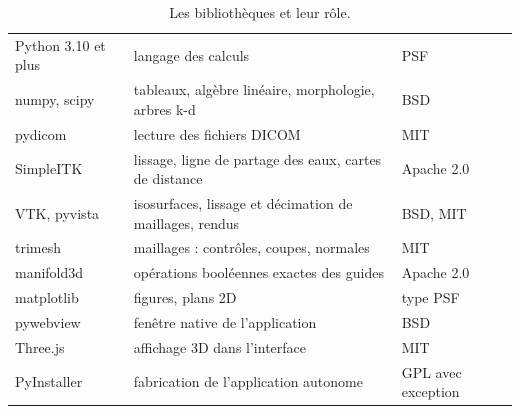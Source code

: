 \begin{table}[htbp]
\centering\small
\caption{Les bibliothèques et leur rôle.}
\label{tab:bibliotheques}
\begin{tabularx}{\linewidth}{L{3.1cm}YL{2.4cm}}
\toprule
{} &  &  \\
\midrule
Python 3.10 et plus & langage des calculs & PSF \\
numpy, scipy \cite{harris2020,virtanen2020} & tableaux, algèbre linéaire, morphologie, arbres k-d & BSD \\
pydicom & lecture des fichiers DICOM & MIT \\
SimpleITK \cite{lowekamp2013} & lissage, ligne de partage des eaux, cartes de distance & Apache 2.0 \\
VTK, pyvista \cite{schroeder2006} & isosurfaces, lissage et décimation de maillages, rendus & BSD, MIT \\
trimesh & maillages : contrôles, coupes, normales & MIT \\
manifold3d \cite{manifold} & opérations booléennes exactes des guides & Apache 2.0 \\
matplotlib & figures, plans 2D & type PSF \\
pywebview & fenêtre native de l'application & BSD \\
Three.js & affichage 3D dans l'interface & MIT \\
PyInstaller & fabrication de l'application autonome & GPL avec exception \\
\bottomrule
\end{tabularx}
\end{table}

